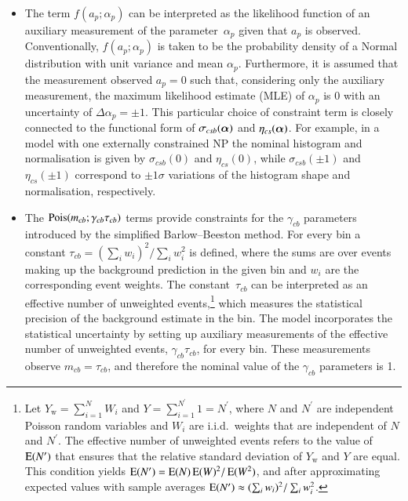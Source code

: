 \begin{itemize}

\item The term $f(a_p; \alpha_p)$ can be interpreted as the likelihood function
  of an auxiliary measurement of the parameter~$\alpha_p$ given that $a_p$ is
  observed. Conventionally, $f(a_p; \alpha_p)$ is taken to be the probability
  density of a Normal distribution with unit variance and mean
  $\alpha_p$. Furthermore, it is assumed that the measurement observed $a_p = 0$
  such that, considering only the auxiliary measurement, the maximum likelihood
  estimate (MLE) of $\alpha_p$ is 0 with an uncertainty of
  $\Delta \alpha_p = \pm 1$. This particular choice of constraint term is
  closely connected to the functional form of $\sigma_{csb}(\bm{\alpha})$ and
  $\eta_{cs}(\bm{\alpha})$. For example, in a model with one externally
  constrained NP the nominal histogram and normalisation is given by
  $\sigma_{csb}(0)$ and $\eta_{cs}(0)$, while $\sigma_{csb}(\pm 1)$ and
  $\eta_{cs}(\pm 1)$ correspond to $\pm 1 \sigma$ variations of the histogram
  shape and normalisation, respectively.


\item The $\operatorname{Pois}(m_{cb}; \gamma_{cb} \tau_{cb})$ terms provide constraints for
  the $\gamma_{cb}$ parameters introduced by the simplified Barlow--Beeston
  method. For every bin a constant
  $ \tau_{cb} = ( \sum_i w_i )^2 / \sum_i w_i^2 $ is defined, where the sums are
  over events making up the background prediction in the given bin and $w_i$ are
  the corresponding event weights. The constant~$\tau_{cb}$ can be interpreted
  as an effective number of unweighted events,\footnote{Let
    $Y_{\text{w}} = \sum_{i = 1}^{N} W_i$ and
    $Y = \sum_{i = 1}^{N^\prime} 1 = N^\prime$, where $N$ and $N^\prime$ are
    independent Poisson random variables and $W_i$ are i.i.d.\ weights that are
    independent of $N$ and $N^\prime$. The effective number of unweighted events
    refers to the value of $\operatorname{E}(N^\prime)$ that ensures that the relative
    standard deviation of $Y_{\text{w}}$ and $Y$ are equal. This condition
    yields $\operatorname{E}(N^\prime) = \operatorname{E}(N) \operatorname{E}(W)^2 / \operatorname{E}(W^2)$, and
    after approximating expected values with sample averages
    $\operatorname{E}(N^\prime) \approx ( \sum_i w_i )^2 / \sum_i w_i^2$.} which measures
  the statistical precision of the background estimate in the bin. The model
  incorporates the statistical uncertainty by setting up auxiliary measurements
  of the effective number of unweighted events, $\gamma_{cb}\tau_{cb}$, for
  every bin. These measurements observe $m_{cb} = \tau_{cb}$, and therefore the
  nominal value of the $\gamma_{cb}$ parameters is 1.
\end{itemize}
%
%

